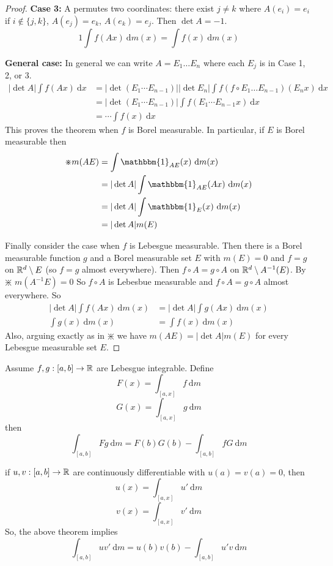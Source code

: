 \begin{proof}
  \textbf{Case 3:} A permutes two coordinates: there exist $j \neq k$ 
  where $A(e_i) = e_i$ if $i \not\in \{j, k\}$, $A(e_j) = e_k$, $A(e_k) = e_j$.
  Then $\det A = -1$.
  \[1 \int f(Ax) \ \mathrm{d}m(x) = \int f(x) \ \mathrm{d}m(x)\]

  \textbf{General case:} In general we can write $A = E_1\dotsc E_n$ where each $E_j$ is in Case 1, 2, or 3.
  \begin{align*}
    |\det A| \int f(Ax) \ \mathrm{d}x &= |\det (E_1 \dotsm E_{n-1})||\det E_n| \int f(f\circ E_1\dotsc E_{n-1})(E_n x) \ \mathrm{d}x  \\
    &= |\det (E_1 \dotsm E_{n-1})| \int f(E_1 \dotsm E_{n-1} x) \ \mathrm{d}x \\
    &= \dotsm \int f(x)\ \mathrm{d}x
  \end{align*}
  This proves the theorem when $f$ is Borel measurable. In particular, if $E$ is Borel measurable then
  \begin{align*}
    \divideontimes m(AE) &= \int \mathbbm{1}_{AE}(x) \ \mathrm{d}m(x)  \\
    &= |\det A| \int \mathbbm{1}_{AE}(Ax) \ \mathrm{d}m(x) \\
    &= |\det A| \int \mathbbm{1}_E(x) \ \mathrm{d}m(x) \\
    &= |\det A| m(E)
  \end{align*}

  Finally consider the case when $f$ is Lebesgue measurable.
  Then there is a Borel measurable function $g$ and a Borel measurable set $E$ with $m(E) = 0$
  and $f = g$ on $\mathbb R^d \setminus E$ (so $f = g$ almost everywhere).
  Then $f \circ A = g\circ A$ on $\mathbb R^d \setminus A^{-1}(E)$. By $\divideontimes$ $m(A^{-1}E) = 0$
  So $f \circ A$ is Lebesbue measurable and $f\circ A = g \circ A$ almost everywhere. So
  \begin{align*}
    |\det A| \int f(Ax) \ \mathrm{d}m(x) &= |\det A| \int g(Ax) \ \mathrm{d}m(x) \\
    \int g(x) \ \mathrm{d}m(x) &= \int f(x) \ \mathrm{d}m(x)
  \end{align*}
  Also, arguing exactly as in $\divideontimes$ we have $m(AE) = |\det A| m(E)$ for every Lebesgue measurable set $E$.
\end{proof}

\begin{theorem}
  Assume $f, g : [a, b] \to \mathbb R$ are Lebesgue integrable. 
  Define
  \[F(x) = \int_{[a, x]} f \ \mathrm{d}m\]
  \[G(x) = \int_{[a, x]} g \ \mathrm{d}m\]
  then 
  \[\int_{[a, b]} Fg \ \mathrm{d}m = F(b)G(b) - \int_{[a, b]} fG \ \mathrm{d}m\]
\end{theorem}
\begin{remark}
  if $u, v: [a, b] \to \mathbb R$ are continuously differentiable with $u(a) = v(a) = 0$, then 
  \[u(x) =\int_{[a, x]} u' \ \mathrm{d}m\]
  \[v(x) =\int_{[a, x]} v' \ \mathrm{d}m\]
  So, the above theorem implies 
  \[\int_{[a, b]}uv' \ \mathrm{d}m = u(b)v(b) - \int_{[a, b]} u'v \ \mathrm{d}m\]
\end{remark}

